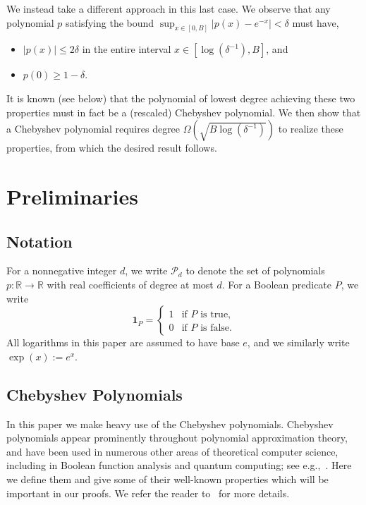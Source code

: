 \documentclass[10pt,a4paper]{article}
\newcommand{\R}{\mathbb{R}}
\theoremstyle{plain}\newtheorem{theorem}{Theorem}
\theoremstyle{definition}
\begin{document}
    We instead take a different approach in this last case. We observe that any polynomial $p$ satisfying the bound $\sup_{x \in [0, B]} \big| p(x) - e^{-x} \big| < \delta$ must have,
    \begin{itemize}
        \item $|p(x)| \leq 2\delta$ in the entire interval $x \in [\log(\delta^{-1}), B]$, and
        \item $p(0) \geq 1-\delta$.
    \end{itemize}
    It is known (see  below) that the polynomial of lowest degree achieving these two properties must in fact be a (rescaled) Chebyshev polynomial. We then show that a Chebyshev polynomial requires degree $\Omega(\sqrt{B \log (\delta^{-1})})$ to realize these properties, from which the desired result follows.
    
    
    
    
    
\section{Preliminaries} \label{sec:prelims}

\subsection{Notation}

For a nonnegative integer $d$, we write $\mathcal{P}_d$ to denote the set of polynomials $p : \R \to \R$ with real coefficients of degree at most $d$.
For a Boolean predicate $P$, we write $$\textbf{1}_{P} = \begin{cases} 1 &\mbox{if } P \mbox{ is true,} \\
0 &\mbox{if } P \mbox{ is false.} \end{cases}$$ 
All logarithms in this paper are assumed to have base $e$, and we similarly write $\exp(x) := e^x$.

\subsection{Chebyshev Polynomials}

In this paper we make heavy use of the Chebyshev polynomials. Chebyshev polynomials appear prominently throughout polynomial approximation theory, and have been used in numerous other areas of theoretical computer science, including in Boolean function analysis and quantum computing; see e.g.,~\cite{bun2021guest}. Here we define them and give some of their well-known properties which will be important in our proofs. We refer the reader to~\cite{P} for more details.
\end{document}
